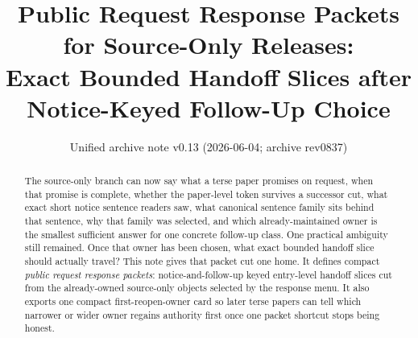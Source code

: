 \documentclass[11pt]{article}
\title{Public Request Response Packets for Source-Only Releases:\\[0.5ex]
\large Exact Bounded Handoff Slices after Notice-Keyed Follow-Up Choice}
\author{}
\date{Unified archive note v0.13 (2026-06-04; archive rev0837)}
\begin{document}
\maketitle

\begin{abstract}
The source-only branch can now say what a terse paper promises on request, when that promise is complete, whether the paper-level token survives a successor cut, what exact short notice sentence readers saw, what canonical sentence family sits behind that sentence, why that family was selected, and which already-maintained owner is the smallest sufficient answer for one concrete follow-up class.
One practical ambiguity still remained.
Once that owner has been chosen, what exact bounded handoff slice should actually travel?
This note gives that packet cut one home.
It defines compact \emph{public request response packets}: notice-and-follow-up keyed entry-level handoff slices cut from the already-owned source-only objects selected by the response menu.
It also exports one compact first-reopen-owner card so later terse papers can tell which narrower or wider owner regains authority first once one packet shortcut stops being honest.
\end{abstract}
\end{document}
